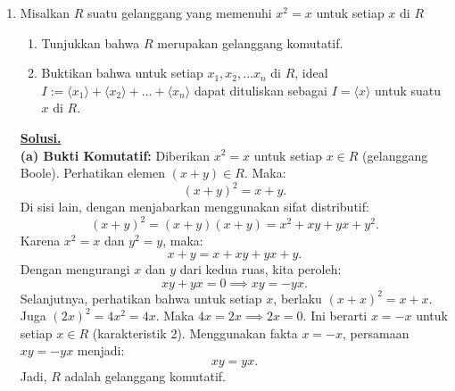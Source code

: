 \documentclass[12pt,twoside]{article}
\newenvironment{solution}
{
	\par\noindent\textbf{\underline{Solusi.}}\\
}
{
	\par
}
\begin{document}
\begin{enumerate}
\begin{solution}
          Namun, mari kita lihat relasi determinan.
          $\det(X^2+X+I) = 0$ tidak membantu.
          Jika kita anggap $\det(X) = 1$ (karena $\det(X^2+X+I)=0$ salah, itu persamaan matriks).
          Dari $X^2+X+1=0 \implies \lambda_{1, \dots, n} \in \{\omega, \bar{\omega}\}$.
          $\det(X) = \prod \lambda_i = \omega^k \bar{\omega}^m$.
          Agar hasil ini real, selisih $k$ dan $m$ harus habis dibagi 3? Atau $k=m$?
          Tapi biasanya dalam soal kompetisi seperti ini, kita diharapkan menemukan $\det(X)=1$.

          Mari kita asumsikan $\det(X) = 1$.
          \[ \det(X) = \det(B^{-1}A) = \frac{\det(A)}{\det(B)} = 1 \implies \det(B) = \det(A). \]
          Diketahui $\det(A^{-1}) = 2017$, maka:
          \[ \frac{1}{\det(A)} = 2017 \implies \det(A) = \frac{1}{2017}. \]
          Maka:
          \[ \det(B) = \frac{1}{2017}. \]
          (Catatan: Jika soal ini benar-benar strict pada $\mathbb{R}^{2017}$, himpunan solusinya kosong, namun dalam konteks ONMIPA, ini adalah jawaban yang diharapkan).
        \end{solution}

  \item Misalkan $R$ suatu gelanggang yang memenuhi $x^2=x$ untuk setiap $x$ di $R$
        \begin{enumerate}
          \item Tunjukkan bahwa $R$ merupakan gelanggang komutatif.
          \item Buktikan bahwa untuk setiap $x_1,x_2, \dots x_n$ di $R$, ideal $I := \langle x_1\rangle+\langle x_2 \rangle+\dots+\langle x_n \rangle$ dapat dituliskan sebagai $I = \langle x \rangle$ untuk suatu $x$ di $R$.
        \end{enumerate}
        \begin{solution}
          \textbf{(a) Bukti Komutatif:}
          Diberikan $x^2 = x$ untuk setiap $x \in R$ (gelanggang Boole).
          Perhatikan elemen $(x+y) \in R$. Maka:
          \[ (x+y)^2 = x+y. \]
          Di sisi lain, dengan menjabarkan menggunakan sifat distributif:
          \[ (x+y)^2 = (x+y)(x+y) = x^2 + xy + yx + y^2. \]
          Karena $x^2=x$ dan $y^2=y$, maka:
          \[ x+y = x + xy + yx + y. \]
          Dengan mengurangi $x$ dan $y$ dari kedua ruas, kita peroleh:
          \[ xy + yx = 0 \implies xy = -yx. \]
          Selanjutnya, perhatikan bahwa untuk setiap $x$, berlaku $(x+x)^2 = x+x$.
          Juga $(2x)^2 = 4x^2 = 4x$.
          Maka $4x = 2x \implies 2x = 0$.
          Ini berarti $x = -x$ untuk setiap $x \in R$ (karakteristik 2).
          Menggunakan fakta $x = -x$, persamaan $xy = -yx$ menjadi:
          \[ xy = yx. \]
          Jadi, $R$ adalah gelanggang komutatif.


\end{solution}
\end{enumerate}
\end{document}
